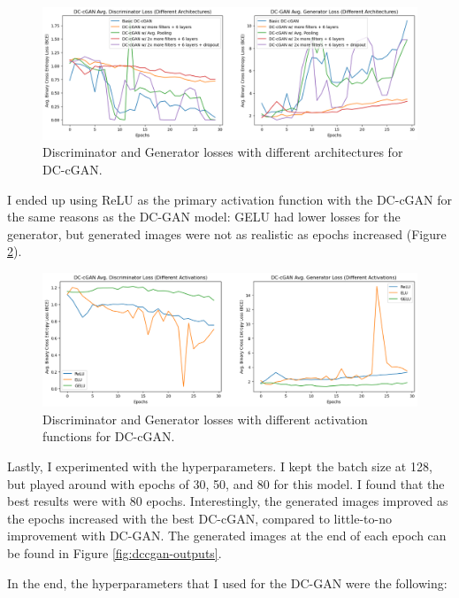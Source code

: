 \documentclass[twoside,11pt]{article}
\begin{document}
\begin{figure}[h!]
  \centering
  \includegraphics[width=17cm]{images/dccgan-experiments/dccgan-archs.png}
  \caption{Discriminator and Generator losses with different architectures for DC-cGAN.}
  \label{fig:dccgan-archs}
\end{figure}

I ended up using ReLU as the primary activation function with the DC-cGAN for the same reasons as the DC-GAN model: GELU had lower losses for the generator, but generated images were not as realistic as epochs increased (Figure \ref{fig:dccgan-activations}).

\begin{figure}[h!]
  \centering
  \includegraphics[width=16cm]{images/dccgan-experiments/dccgan-activations.png}
  \caption{Discriminator and Generator losses with different activation functions for DC-cGAN.}
  \label{fig:dccgan-activations}
\end{figure}

\newpage

Lastly, I experimented with the hyperparameters. I kept the batch size at 128, but played around with epochs of 30, 50, and 80 for this model. I found that the best results were with 80 epochs. Interestingly, the generated images improved as the epochs increased with the best DC-cGAN, compared to little-to-no improvement with DC-GAN. The generated images at the end of each epoch can be found in Figure \ref{fig:dccgan-outputs}.

\noindent In the end, the hyperparameters that I used for the DC-GAN were the following:
\end{document}
